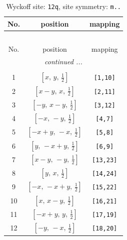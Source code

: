 \documentclass[fleqn,8pt]{jsarticle}
\begin{document}
\begin{longtable}{ccc}
\caption{Wyckoff site: {\tt 12q}, site symmetry: {\tt m..}}
 \\
 \hline \hline
No. & position & mapping \\ \hline \endfirsthead

\multicolumn{2}{l}{\tablename\ \thetable{}} \\
 \hline \hline
No. & position & mapping \\ \hline \endhead

 \hline \hline
\multicolumn{2}{r}{\footnotesize\it continued ...} \\ \endfoot

 \hline \hline
\multicolumn{2}{r}{} \\ \endlastfoot

1 & $\left[ x,\, y,\, \frac{1}{2} \right]$ & {\tt [1,10]} \\ \hline
2 & $\left[ x - y,\, x,\, \frac{1}{2} \right]$ & {\tt [2,11]} \\ \hline
3 & $\left[ - y,\, x - y,\, \frac{1}{2} \right]$ & {\tt [3,12]} \\ \hline
4 & $\left[ - x,\, - y,\, \frac{1}{2} \right]$ & {\tt [4,7]} \\ \hline
5 & $\left[ - x + y,\, - x,\, \frac{1}{2} \right]$ & {\tt [5,8]} \\ \hline
6 & $\left[ y,\, - x + y,\, \frac{1}{2} \right]$ & {\tt [6,9]} \\ \hline
7 & $\left[ x - y,\, - y,\, \frac{1}{2} \right]$ & {\tt [13,23]} \\ \hline
8 & $\left[ y,\, x,\, \frac{1}{2} \right]$ & {\tt [14,24]} \\ \hline
9 & $\left[ - x,\, - x + y,\, \frac{1}{2} \right]$ & {\tt [15,22]} \\ \hline
10 & $\left[ x,\, x - y,\, \frac{1}{2} \right]$ & {\tt [16,21]} \\ \hline
11 & $\left[ - x + y,\, y,\, \frac{1}{2} \right]$ & {\tt [17,19]} \\ \hline
12 & $\left[ - y,\, - x,\, \frac{1}{2} \right]$ & {\tt [18,20]} \\
\end{longtable}
\renewcommand{\arraystretch}{1.2}
\end{document}
